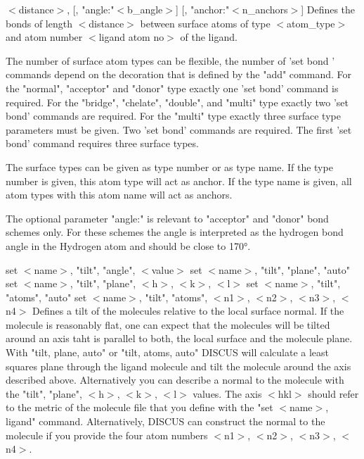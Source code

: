                     $ <$distance$> $, [, "angle:"$ <$b\_angle$> $] 
                                [, "anchor:"$ <$n\_anchors$> $] 
    Defines the bonds of length $ <$distance$> $ between surface atoms of type 
    $ <$atom\_type$> $ and atom number $ <$ligand atom no$> $ of the ligand. 
\par
    The number of surface atom types can be flexible, the number 
    of 'set bond ' commands depend on the 
    decoration that is defined by the "add" command. 
    For the "normal", "acceptor" and "donor" type exactly 
        one 'set bond' command is required. 
    For the "bridge", "chelate", "double", and "multi" type exactly 
        two 'set bond' commands are required. 
    For the "multi" type exactly three surface type 
        parameters must be given. 
        Two 'set bond' commands are required. 
        The first 'set bond' command requires three surface types. 
\par
    The surface types can be given as type number or as type name. 
    If the type number is given, this atom type will act as anchor. 
    If the type name is given, all atom types with this atom name will act 
    as anchors. 
\par
    The optional parameter "angle:" is relevant to "acceptor" and 
    "donor" bond schemes only. For these schemes the angle is 
    interpreted as the hydrogen bond angle in the Hydrogen atom and 
    should be close to 170°. 
\par
set $ <$name$> $, "tilt", "angle", $ <$value$> $ 
set $ <$name$> $, "tilt", "plane", "auto" 
set $ <$name$> $, "tilt", "plane", $ <$h$> $, $ <$k$> $, $ <$l$> $ 
set $ <$name$> $, "tilt", "atoms", "auto" 
set $ <$name$> $, "tilt", "atoms", $ <$n1$> $, $ <$n2$> $, $ <$n3$> $, $ <$n4$> $ 
    Defines a tilt of the molecules relative to the local surface normal. 
    If the molecule is reasonably flat, one can expect that the molecules 
    will be tilted around an axis taht is parallel to both, the 
    local surface and the molecule plane. 
    With "tilt, plane, auto" or "tilt, atoms, auto" DISCUS will 
    calculate a least squares plane through the ligand molecule and 
    tilt the molecule around the axis described above. 
    Alternatively you can describe a normal to the molecule with the 
    "tilt", "plane", $ <$h$> $, $ <$k$> $, $ <$l$> $ values. The axis $ <$hkl$> $ should refer to 
    the metric of the molecule file that you define with the 
    "set $ <$name$> $, ligand" command. 
    Alternatively, DISCUS can construct the normal to the molecule 
    if you provide the four atom numbers $ <$n1$> $, $ <$n2$> $, $ <$n3$> $, $ <$n4$> $. 
